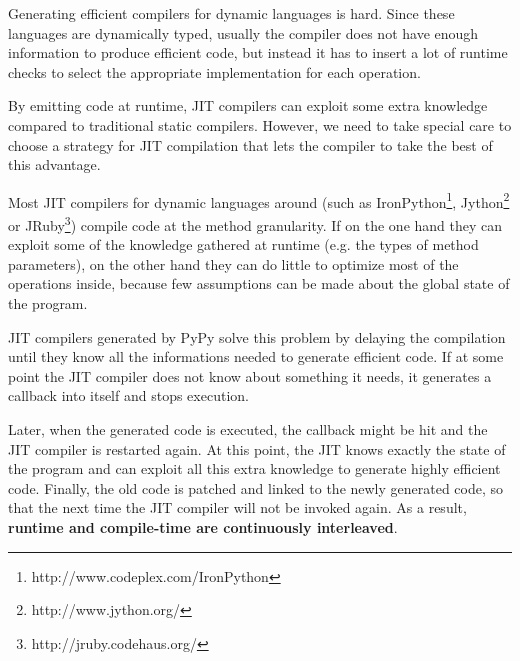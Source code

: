 
Generating efficient compilers for dynamic languages is hard.  Since these
languages are dynamically typed, usually the compiler does not have enough
information to produce efficient code, but instead it has to insert a lot of
runtime checks to select the appropriate implementation for each operation.

By emitting code at runtime, JIT compilers can exploit some extra knowledge
compared to traditional static compilers.  However, we need to take special
care to choose a strategy for JIT compilation that lets the compiler to take
the best of this advantage.

Most JIT compilers for dynamic languages around (such as
IronPython\footnote{http://www.codeplex.com/IronPython},
Jython\footnote{http://www.jython.org/} or
JRuby\footnote{http://jruby.codehaus.org/}) compile code at the method
granularity.  If on the one hand they can exploit some of the knowledge
gathered at runtime (e.g. the types of method parameters), on the other hand
they can do little to optimize most of the operations inside, because few
assumptions can be made about the global state of the program.

JIT compilers generated by PyPy solve this problem by delaying the compilation
until they know all the informations needed to generate efficient code.  If at
some point the JIT compiler does not know about something it needs, it
generates a callback into itself and stops execution.  

Later, when the generated code is executed, the callback might be hit and the JIT
compiler is restarted again.  At this point, the JIT knows exactly the state
of the program and can exploit all this extra knowledge to generate highly
efficient code.  Finally, the old code is patched and linked to the newly
generated code, so that the next time the JIT compiler will not be invoked
again.  As a result, \textbf{runtime and compile-time are continuously
interleaved}. 

